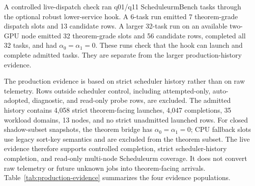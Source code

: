 \documentclass[opre,dblanonrev]{informs4}
\begin{document}
A controlled live-dispatch check ran q01/q11 ScheduleurmBench tasks through the
optional robust lower-service hook.  A 6-task run emitted 7 theorem-grade
dispatch slots and 13 candidate rows.  A larger 32-task run on an available
two-GPU node emitted 32 theorem-grade slots and 56 candidate rows, completed all
32 tasks, and had \(\alpha_0=\alpha_1=0\).  These runs check that the hook can
launch and complete admitted tasks.  They are separate from the larger
production-history evidence.

The production evidence is based on strict scheduler history rather than on
raw telemetry.  Rows outside scheduler control, including attempted-only,
auto-adopted, diagnostic, and read-only probe rows, are excluded.  The admitted
history contains 4,058 strict theorem-facing launches, 4,047 completions, 35
workload domains, 13 nodes, and no strict unadmitted launched rows.  For
closed shadow-subset snapshots, the theorem bridge has \(\alpha_0=\alpha_1=0\);
CPU fallback slots use legacy sort-key semantics and are excluded from the
theorem subset.  The live evidence therefore supports controlled completion,
strict scheduler-history completion, and read-only multi-node Scheduleurm
coverage.  It does not convert raw telemetry or future unknown jobs into
theorem-facing arrivals.  Table~\ref{tab:production-evidence} summarizes the
four evidence populations.
\end{document}
